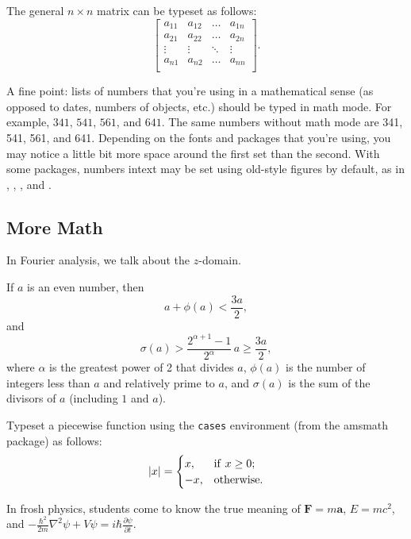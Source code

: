 \documentclass{icmmcm}
\newcommand{\package}[1]{\textsf{#1}\xspace}
\newcommand{\env}[1]{\texttt{#1}\xspace}
\begin{document}
{The general $n \times n$ matrix can be typeset as follows:
\begin{equation}
\left[
\begin{array}{cccc}
a_{11} & a_{12} & \ldots & a_{1n}\\
a_{21} & a_{22} & \ldots & a_{2n}\\
\vdots & \vdots & \ddots & \vdots\\
a_{n1} & a_{n2} & \ldots & a_{nn}\\
\end{array} 
\right].
\end{equation}


A fine point: lists of numbers that you're using in a mathematical
sense (as opposed to dates, numbers of objects, etc.) should be typed
in math mode.  For example, $341$, $541$, $561$, and $641$.  The same
numbers without math mode are 341, 541, 561, and 641.  Depending on
the fonts and packages that you're using, you may notice a little bit
more space around the first set than the second.  With some packages,
numbers intext may be set using old-style figures by default, as in
, , , and
.  %


\subsection{More Math}

In Fourier analysis, we talk about the $z$-domain.

If $a$ is an even number, then
\[ a + \phi(a) < \frac{3 a}{2}, \]
and
\[ \sigma(a) > \frac{2^{\alpha+1}-1}{2^{\alpha}} \, a \geq \frac{3
  a}{2}, \]
where $\alpha$ is the greatest power of 2 that divides $a$, $\phi(a)$
is the number of integers less than $a$ and relatively prime
to $a$, and $\sigma(a)$ is the sum of the divisors of $a$ (including
$1$ and $a$). 

Typeset a piecewise function using the \env{cases} environment (from
the \package{amsmath} package) as follows:
\[ |x| = 
\begin{cases} 
   x, & {\rm if~}x \geq 0;\\
  -x, & {\rm otherwise.}\\
\end{cases}
\]

In frosh physics, students come to know the true meaning of
$\mathbf{F} = m \mathbf{a}$, $E = mc^{2}$, and $-\frac{\hbar^{2}}{2m} 
\nabla^{2} \psi + V \psi = i \hbar \frac{\partial \psi}{\partial t}$.

}
\end{document}
